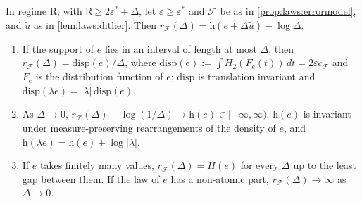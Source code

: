 \begin{theorem}\label{thm:laws:entropy}
In regime R, with $\mathsf R\ge2\varepsilon^*+\Delta$, let $\varepsilon\ge\varepsilon^*$ and $\mathcal F$ be as in \cref{prop:laws:errormodel}, and $\tilde u$ as in \cref{lem:laws:dither}. Then $r_{\mathcal F}(\Delta)=\mathrm h(e+\Delta\tilde u)-\log\Delta$.
\begin{enumerate}[label=(\alph*),itemsep=1pt,topsep=2pt]
\item If the support of $e$ lies in an interval of length at most $\Delta$, then $r_{\mathcal F}(\Delta)=\mathrm{disp}(e)/\Delta$, where $\mathrm{disp}(e):=\int H_2(F_e(t))\,dt=2\varepsilon c_{\mathcal F}$ and $F_e$ is the distribution function of $e$; $\mathrm{disp}$ is translation invariant and $\mathrm{disp}(\lambda e)=\lvert\lambda\rvert\,\mathrm{disp}(e)$.
\item As $\Delta\to0$, $r_{\mathcal F}(\Delta)-\log(1/\Delta)\to\mathrm h(e)\in[-\infty,\infty)$. $\mathrm h(e)$ is invariant under measure-preserving rearrangements of the density of $e$, and $\mathrm h(\lambda e)=\mathrm h(e)+\log\lvert\lambda\rvert$.
\item If $e$ takes finitely many values, $r_{\mathcal F}(\Delta)=H(e)$ for every $\Delta$ up to the least gap between them. If the law of $e$ has a non-atomic part, $r_{\mathcal F}(\Delta)\to\infty$ as $\Delta\to0$.
\end{enumerate}
\end{theorem}

